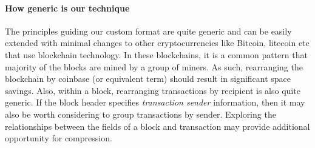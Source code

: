 \paragraph{How generic is our technique}

The principles guiding our custom format are quite generic and can be easily
extended with minimal changes to other cryptocurrencies like Bitcoin, litecoin etc that use blockchain technology. 
In these blockchains, it is a common pattern that majority of the blocks are mined by a group of miners. As such, rearranging the blockchain by coinbase (or equivalent term) should result in significant space savings.
Also, within a block, rearranging transactions by recipient is also 
quite generic.
If the block header specifies \emph{transaction sender} information, then
it may also be worth considering to group transactions by sender.
Exploring the relationships between the fields of a block and transaction
may provide additional opportunity for compression. 
